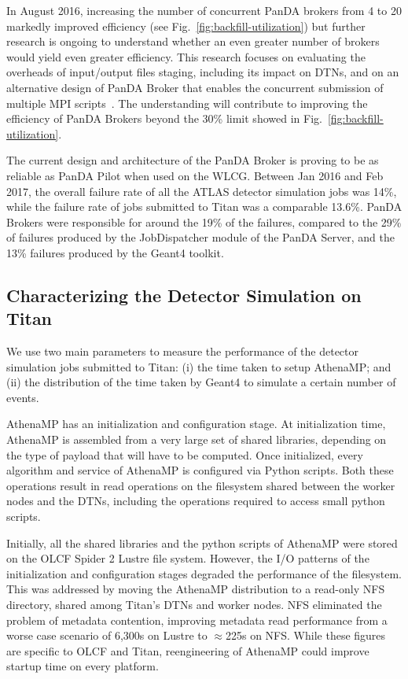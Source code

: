 In August 2016, increasing the number of concurrent PanDA brokers from 4 to
20 markedly improved efficiency (see Fig.~\ref{fig:backfill-utilization}) but
further research is ongoing to understand whether an even greater number of
brokers would yield even greater efficiency. This research focuses on
evaluating the overheads of input/output files staging, including its impact
on DTNs, and on an alternative design of PanDA Broker that enables the
concurrent submission of multiple MPI scripts~\cite{barreiro2016panda}. The
understanding will contribute to improving the efficiency of PanDA Brokers
beyond the 30\% limit showed in Fig.~\ref{fig:backfill-utilization}.

The current design and architecture of the PanDA Broker is proving to be as
reliable as PanDA Pilot when used on the WLCG\@. Between Jan 2016 and Feb
2017, the overall failure rate of all the ATLAS detector simulation jobs was
14\%, while the failure rate of jobs submitted to Titan was a comparable
13.6\%. PanDA Brokers were responsible for around the 19\% of the failures,
compared to the 29\% of failures produced by the JobDispatcher module of the
PanDA Server, and the 13\% failures produced by the Geant4 toolkit. 

\subsection{Characterizing the Detector Simulation on
Titan}\label{ssec:athenamp_titan}

We use two main parameters to measure the performance of the detector
simulation jobs submitted to Titan: (i) the time taken to setup AthenaMP\@;
and (ii) the distribution of the time taken by Geant4 to simulate a certain
number of events.

AthenaMP has an initialization and configuration stage. At initialization
time, AthenaMP is assembled from a very large set of shared libraries,
depending on the type of payload that will have to be computed. Once
initialized, every algorithm and service of AthenaMP is configured via Python
scripts. Both these operations result in read operations on the filesystem
shared between the worker nodes and the DTNs, including the operations
required to access small python scripts.

Initially, all the shared libraries and the python scripts of AthenaMP were
stored on the OLCF Spider 2 Lustre file system. However, the I/O patterns of
the initialization and configuration stages degraded the performance of the
filesystem. This was addressed by moving the AthenaMP distribution to a
read-only NFS directory, shared among Titan's DTNs and worker nodes. NFS
eliminated the problem of metadata contention, improving metadata read
performance from a worse case scenario of 6,300s on Lustre to \(\approx\)225s
on NFS\@. While these figures are specific to OLCF and Titan, reengineering
of AthenaMP could improve startup time on every platform.

